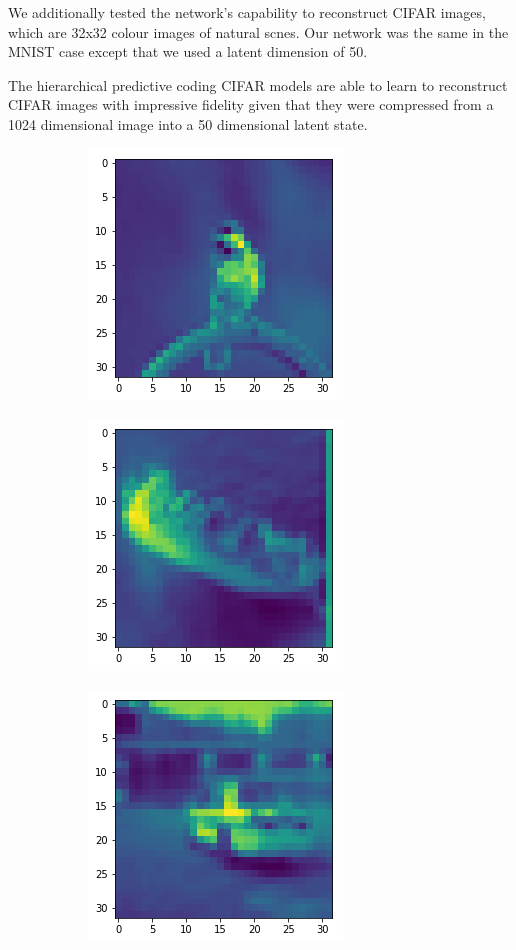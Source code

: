 We additionally tested the network's capability to reconstruct CIFAR images, which are 32x32 colour images of natural scnes. Our network was the same in the MNIST case except that we used a latent dimension of 50. 

The hierarchical predictive coding CIFAR models are able to learn to reconstruct CIFAR images with impressive fidelity given that they were compressed from a 1024 dimensional image into a 50 dimensional latent state.

\begin{figure}[H]
\centering
\begin{subfigure}{.3\linewidth}
    \centering
    \includegraphics[scale=0.4]{chapter_3_figures/cifar_bird.png}
\end{subfigure}
    \hfill
\begin{subfigure}{.3\linewidth}
    \centering
    \includegraphics[scale=0.4]{chapter_3_figures/cifar_boat.png}
\end{subfigure}
   \hfill
\begin{subfigure}{.3\linewidth}
    \centering
    \includegraphics[scale=0.4]{chapter_3_figures/cifar_car.png}
\end{subfigure}


\end{figure}
